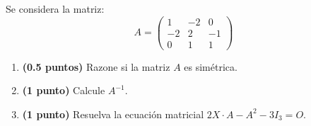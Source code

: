 
Se considera la matriz:
\[
A=\begin{pmatrix}
1 & -2 & 0\\
-2 & 2 & -1\\
0 & 1 & 1
\end{pmatrix}
\]
\begin{enumerate}[label=\alph*),leftmargin=2.4em]
  \item \textbf{(0.5 puntos)} Razone si la matriz \(A\) es simétrica.
  \item \textbf{(1 punto)} Calcule \(A^{-1}\).
  \item \textbf{(1 punto)} Resuelva la ecuación matricial \(2X\cdot A-A^2-3I_3=O\).
\end{enumerate}
